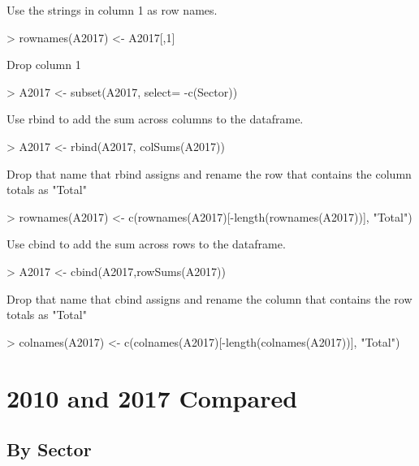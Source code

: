 \documentclass[letterpaper]{article}
\begin{document}
Use the strings in column 1 as row names.
\begin{Schunk}
\begin{Sinput}
> rownames(A2017) <- A2017[,1]
\end{Sinput}
\end{Schunk}

Drop column 1
\begin{Schunk}
\begin{Sinput}
> A2017 <-  subset(A2017, select= -c(Sector))
\end{Sinput}
\end{Schunk}

Use rbind to add the sum across columns to the dataframe.
\begin{Schunk}
\begin{Sinput}
> A2017 <- rbind(A2017, colSums(A2017))
\end{Sinput}
\end{Schunk}

Drop that name that rbind assigns and rename the row that contains the column totals as "Total"
\begin{Schunk}
\begin{Sinput}
> rownames(A2017) <- c(rownames(A2017)[-length(rownames(A2017))], "Total")
\end{Sinput}
\end{Schunk}

Use cbind to add the sum across rows to the dataframe.
\begin{Schunk}
\begin{Sinput}
> A2017 <- cbind(A2017,rowSums(A2017))
\end{Sinput}
\end{Schunk}

Drop that name that cbind assigns and rename the column that contains the row totals as "Total"
\begin{Schunk}
\begin{Sinput}
> colnames(A2017) <- c(colnames(A2017)[-length(colnames(A2017))], "Total")
\end{Sinput}
\end{Schunk}

\section{2010 and 2017 Compared}

\subsection{By Sector}
\end{document}
